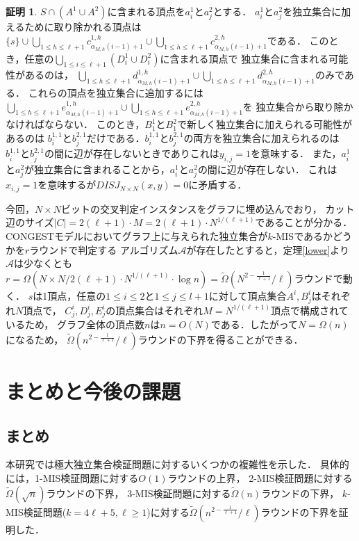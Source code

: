 \documentclass[12pt]{thesis}
\newcommand{\CONGEST}{\textsf{CONGEST}}
\theoremstyle{definition}
\newtheorem*{prf*}{証明}
\begin{document}
\begin{prf*}
$S \cap (A^{1}\cup A^{2})$に含まれる頂点を$a^{1}_{i}$と$a^{2}_{j}$とする．
$a^{1}_{i}$と$a^{2}_{j}$を独立集合に加えるために取り除かれる頂点は
$\{s\} \cup \bigcup_{1\leq h \leq \ell+1} c^{1,h}_{\alpha_{M,h}(i-1)+1} \cup 
\bigcup_{1\leq h \leq \ell+1} c^{2,h}_{\alpha_{M,h}(i-1)+1}$である．
このとき，任意の$\bigcup_{1 \leq i \leq \ell+1}(D^{1}_{i}\cup D^{2}_{i})$に含まれる頂点で
独立集合に含まれる可能性があるのは，
$\bigcup_{1\leq h \leq \ell+1} d^{1,h}_{\alpha_{M,h}(i-1)+1}\cup 
\bigcup_{1\leq h \leq \ell+1} d^{2,h}_{\alpha_{M,h}(i-1)+1}$のみである．
これらの頂点を独立集合に追加するには
$\bigcup_{1\leq h \leq \ell+1} e^{1,h}_{\alpha_{M,h}(i-1)+1}\cup 
\bigcup_{1\leq h \leq \ell+1} e^{2,h}_{\alpha_{M,h}(i-1)+1}$を
独立集合から取り除かなければならない．
このとき，$B^{1}_{1}$と$B^{2}_{1}$で新しく独立集合に加えられる可能性があるのは
$b^{1,1}_{i}$と$b^{2,1}_{j}$だけである．$b^{1,1}_{i}$と$b^{2,1}_{j}$の両方を独立集合に加えられるのは
$b^{1,1}_{i}$と$b^{2,1}_{j}$の間に辺が存在しないときでありこれは$y_{i,j}=1$を意味する．
また，$a^{1}_{i}$と$a^{2}_{j}$が独立集合に含まれることから，$a^{1}_{i}$と$a^{2}_{j}$の間に辺が存在しない．
これは$x_{i,j}=1$を意味するが$DISJ_{N\times N}(x,y)=0$に矛盾する．

今回，$N \times N$ビットの交叉判定インスタンスをグラフに埋め込んでおり，
カット辺のサイズ$|C| = 2(\ell + 1) \cdot M = 2(\ell + 1) \cdot N^{1/(\ell + 1)}$であることが分かる．
{\CONGEST}モデルにおいてグラフ上に与えられた独立集合が$k$-MISであるかどうかを$r$ラウンドで判定する
アルゴリズム$\mathcal{A}$が存在したとすると，定理\ref{lower}より$\mathcal{A}$は少なくとも
$r = \Omega \left(N \times N/2(\ell + 1) \cdot N^{1/(\ell + 1)} \cdot \log n\right) = 
\tilde{\Omega}\left(N^{2 - \frac{1}{\ell + 1}}/\ell \right)$ラウンドで動く．
$s$は1頂点，任意の$1\leq i \leq 2$と$1\leq j \leq l+1$に対して頂点集合$A^{i}, B^{i}_{j}$はそれぞれ$N$頂点で，
$C^{i}_{j},D^{i}_{j},E^{i}_{j}$の頂点集合はそれぞれ$M=N^{1/(\ell + 1)}$頂点で構成されているため，
グラフ全体の頂点数$n$は$n = O(N)$である．したがって$N = \Omega(n)$になるため，
$\tilde{\Omega}\left(n^{2 - \frac{1}{\ell + 1}}/\ell \right)$ラウンドの下界を得ることができる．
\end{prf*}
\newpage

\chapter{まとめと今後の課題}
\section{まとめ}
本研究では極大独立集合検証問題に対するいくつかの複雑性を示した．
具体的には，1-MIS検証問題に対する$O(1)$ラウンドの上界，
2-MIS検証問題に対する$\tilde{\Omega} (\sqrt{n})$ラウンドの下界，
3-MIS検証問題に対する$\tilde{\Omega} (n)$ラウンドの下界，
$k$-MIS検証問題($k = 4\ell + 5, \ell \geq 1$)に対する$\tilde{\Omega}\left(n^{2 - \frac{1}{\ell + 1}}/\ell \right)$ラウンドの下界を証明した．
\end{document}
